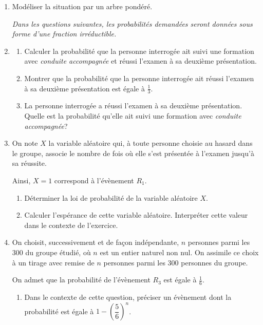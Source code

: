 \documentclass[10pt]{article}
\begin{document}
\begin{enumerate}
\item  Modéliser la situation par un arbre pondéré.

\emph{Dans les questions suivantes, les probabilités demandées seront données sous forme d’une fraction irréductible.}

\item 
	\begin{enumerate}
		\item Calculer la probabilité que la personne interrogée ait suivi une formation avec \emph{conduite accompagnée} et réussi l’examen à sa deuxième présentation.
		\item Montrer que la probabilité que la personne interrogée ait réussi l’examen à sa deuxième présentation est égale à $\frac{1}{3}$.
		\item La personne interrogée a réussi l’examen à sa deuxième présentation. Quelle est la probabilité qu’elle ait suivi une formation avec \emph{conduite accompagnée}?
	\end{enumerate}
\item On note $X$ la variable aléatoire qui, à toute personne choisie au hasard dans le groupe, associe le nombre de fois où elle s’est présentée à l’examen jusqu’à sa réussite.

Ainsi, ${X=1}$ correspond à l’évènement $R_1$.
	\begin{enumerate}
		\item  Déterminer la loi de probabilité de la variable aléatoire $X$.
		\item Calculer l’espérance de cette variable aléatoire. Interpréter cette valeur dans le contexte de l’exercice.
	\end{enumerate}
\item On choisit, successivement et de façon indépendante, $n$ personnes parmi les 300 du groupe étudié, où $n$ est un entier naturel non nul. On assimile ce choix à un tirage avec remise de $n$ personnes parmi les 300 personnes du groupe.

On admet que la probabilité de l’évènement $R_3$ est égale à $\frac{1}{6}$.
	\begin{enumerate}
		\item  Dans le contexte de cette question, préciser un évènement dont la probabilité est égale à $1-\left(\dfrac{5}{6}\right)^n$.


\end{enumerate}
\end{enumerate}
\end{document}
